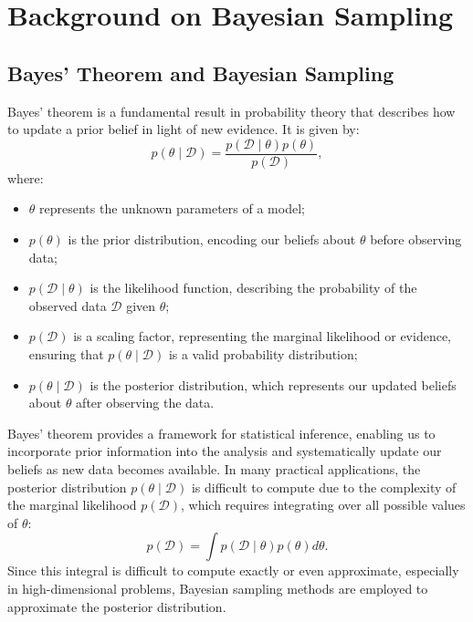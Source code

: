 \documentclass[11pt, twoside]{report}
\begin{document}

\chapter{Background on Bayesian Sampling}
\section{Bayes' Theorem and Bayesian Sampling}
Bayes' theorem is a fundamental result in probability theory that describes how to update a prior belief in light of new evidence. It is given by:
\begin{equation}
p(\theta \mid \mathcal{D}) = \frac{p(\mathcal{D} \mid \theta) p(\theta)}{p(\mathcal{D})},
\end{equation}
where:
\begin{itemize}
\item $\theta$ represents the unknown parameters of a model;
\item $p(\theta)$ is the prior distribution, encoding our beliefs about $\theta$ before observing data;
\item $p(\mathcal{D} \mid \theta)$ is the likelihood function, describing the probability of the observed data $\mathcal{D}$ given $\theta$;
\item $p(\mathcal{D})$ is a scaling factor, representing the marginal likelihood or evidence, ensuring that $p(\theta \mid \mathcal{D})$ is a valid probability distribution;
\item $p(\theta \mid \mathcal{D})$ is the posterior distribution, which represents our updated beliefs about $\theta$ after observing the data.
\end{itemize}
Bayes' theorem provides a framework for statistical inference, enabling us to incorporate prior information into the analysis and systematically update our beliefs as new data becomes available. In many practical applications, the posterior distribution $p(\theta \mid \mathcal{D})$ is difficult to compute due to the complexity of the marginal likelihood $p(\mathcal{D})$, which requires integrating over all possible values of $\theta$:
\begin{equation}
p(\mathcal{D}) = \int p(\mathcal{D} \mid \theta) p(\theta) d\theta.
\end{equation}
Since this integral is difficult to compute exactly or even approximate, especially in high-dimensional problems, Bayesian sampling methods are employed to approximate the posterior distribution.
\end{document}
